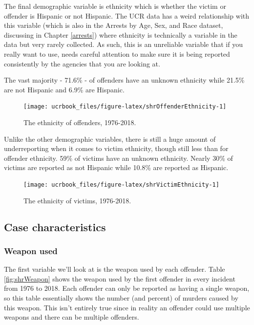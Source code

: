 \documentclass[
  12pt,
  openany]{book}
\begin{document}
The final demographic variable is ethnicity which is whether the victim or offender is Hispanic or not Hispanic. The UCR data has a weird relationship with this variable (which is also in the Arrests by Age, Sex, and Race dataset, discussing in Chapter \ref{arrests}) where ethnicity is technically a variable in the data but very rarely collected. As such, this is an unreliable variable that if you really want to use, needs careful attention to make sure it is being reported consistently by the agencies that you are looking at.

The vast majority - 71.6\% - of offenders have an unknown ethnicity while 21.5\% are not Hispanic and 6.9\% are Hispanic.

\begin{figure}

{\centering \texttt{[image: ucrbook\_files/figure-latex/shrOffenderEthnicity-1]} 

}

\caption{The ethnicity of offenders, 1976-2018.}\label{fig:shrOffenderEthnicity}
\end{figure}

Unlike the other demographic variables, there is still a huge amount of underreporting when it comes to victim ethnicity, though still less than for offender ethnicity. 59\% of victims have an unknown ethnicity. Nearly 30\% of victims are reported as not Hispanic while 10.8\% are reported as Hispanic.

\begin{figure}

{\centering \texttt{[image: ucrbook\_files/figure-latex/shrVictimEthnicity-1]} 

}

\caption{The ethnicity of victims, 1976-2018.}\label{fig:shrVictimEthnicity}
\end{figure}

\hypertarget{case-characteristics}{%
\subsection{Case characteristics}\label{case-characteristics}}

\hypertarget{weapon-used}{%
\subsubsection{Weapon used}\label{weapon-used}}

The first variable we'll look at is the weapon used by each offender. Table \ref{fig:shrWeapon} shows the weapon used by the first offender in every incident from 1976 to 2018. Each offender can only be reported as having a single weapon, so this table essentially shows the number (and percent) of murders caused by this weapon. This isn't entirely true since in reality an offender could use multiple weapons and there can be multiple offenders.
\end{document}
